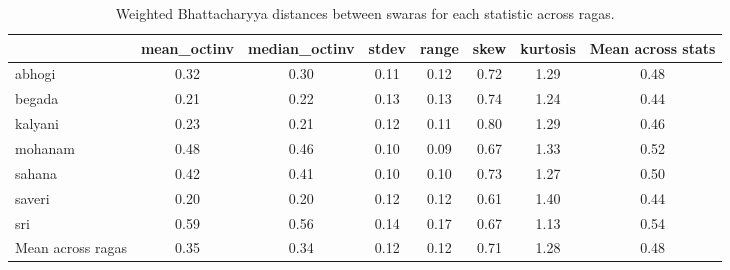 \begin{table}
\caption{Weighted Bhattacharyya distances between swaras for each statistic across ragas.}
\label{tab:weighted_bhattacharyya}
\begin{tabular}{lccccccc}
\toprule
 & mean_octinv & median_octinv & stdev & range & skew & kurtosis & Mean across stats \\
\midrule
abhogi & 0.32 & 0.30 & 0.11 & 0.12 & 0.72 & 1.29 & 0.48 \\
begada & 0.21 & 0.22 & 0.13 & 0.13 & 0.74 & 1.24 & 0.44 \\
kalyani & 0.23 & 0.21 & 0.12 & 0.11 & 0.80 & 1.29 & 0.46 \\
mohanam & 0.48 & 0.46 & 0.10 & 0.09 & 0.67 & 1.33 & 0.52 \\
sahana & 0.42 & 0.41 & 0.10 & 0.10 & 0.73 & 1.27 & 0.50 \\
saveri & 0.20 & 0.20 & 0.12 & 0.12 & 0.61 & 1.40 & 0.44 \\
sri & 0.59 & 0.56 & 0.14 & 0.17 & 0.67 & 1.13 & 0.54 \\
Mean across ragas & 0.35 & 0.34 & 0.12 & 0.12 & 0.71 & 1.28 & 0.48 \\
\bottomrule
\end{tabular}
\end{table}
